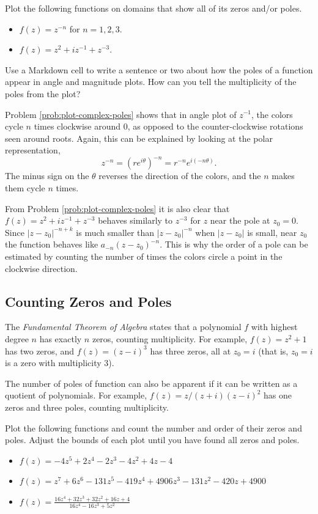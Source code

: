 \begin{problem} %
Plot the following functions on domains that show all of its zeros and/or poles.
\begin{itemize}
\item $f(z) = z^{-n}$ for $n=1,2,3$.
\item $f(z) = z^2+iz^{-1}+z^{-3}$.
\end{itemize}
Use a Markdown cell to write a sentence or two about how the poles of a function appear in angle and magnitude plots.
How can you tell the multiplicity of the poles from the plot?
\label{prob:plot-complex-poles}
\end{problem}

Problem \ref{prob:plot-complex-poles} shows that in angle plot of $z^{-1}$, the colors cycle $n$ times clockwise around $0$, as opposed to the counter-clockwise rotations seen around roots.
Again, this can be explained by looking at the polar representation,
\[
z^{-n} = (re^{i \theta})^{-n} = r^{-n} e^{i(-n\theta)}.
\]
The minus sign on the $\theta$ reverses the direction of the colors, and the $n$ makes them cycle $n$ times.

From Problem \ref{prob:plot-complex-poles} it is also clear that $f(z) = z^2+iz^{-1}+z^{-3}$ behaves similarly to $z^{-3}$ for $z$ near the pole at $z_0 = 0$.
Since $|z-z_0|^{-n+k}$ is much smaller than $|z-z_0|^{-n}$ when $|z-z_0|$ is small, near $z_0$ the function behaves like $a_{-n}(z-z_0)^{-n}$.
This is why the order of a pole can be estimated by counting the number of times the colors circle a point in the clockwise direction.

\subsection*{Counting Zeros and Poles} %

The \emph{Fundamental Theorem of Algebra} states that a polynomial $f$ with highest degree $n$ has exactly $n$ zeros, counting multiplicity.
For example, $f(z) = z^2 + 1$ has two zeros, and $f(z) = (z-i)^3$ has three zeros, all at $z_0 = i$ (that is, $z_0=i$ is a zero with multiplicity $3$).

The number of poles of function can also be apparent if it can be written as a quotient of polynomials.
For example, $f(z) = z / (z+i)(z-i)^2$ has one zeros and three poles, counting multiplicity.

\begin{problem}
Plot the following functions and count the number and order of their zeros and poles.
Adjust the bounds of each plot until you have found all zeros and poles.
\begin{itemize}
\item $f(z) = -4z^5 + 2z^4 - 2z^3 - 4z^2 + 4z - 4$
\item $f(z) = z^7 + 6z^6 - 131z^5 - 419z^4 + 4906z^3 - 131z^2 - 420z + 4900$
\item $f(z) = \frac{16z^4 + 32z^3 + 32z^2 + 16z + 4}{16z^4 - 16z^3 + 5z^2}$
\end{itemize}
\end{problem}

